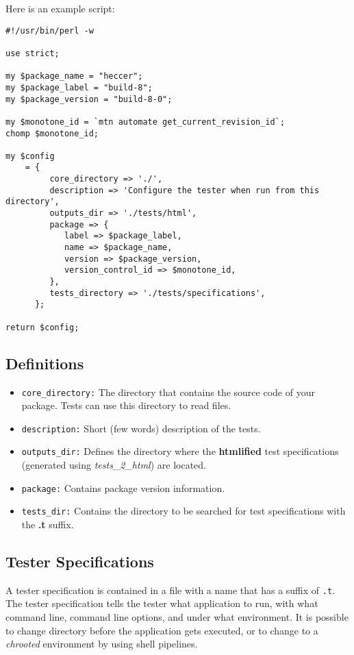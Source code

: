 \documentclass[12pt]{article}
\begin{document}
Here is an example script:
\begin{verbatim}
#!/usr/bin/perl -w

use strict;

my $package_name = "heccer";
my $package_label = "build-8";
my $package_version = "build-8-0";

my $monotone_id = `mtn automate get_current_revision_id`;
chomp $monotone_id;

my $config
    = {
         core_directory => './',
         description => 'Configure the tester when run from this directory',
         outputs_dir => './tests/html',
         package => {
            label => $package_label,
            name => $package_name,
            version => $package_version,
            version_control_id => $monotone_id,
         },
         tests_directory => './tests/specifications',
      };

return $config;
\end{verbatim}

\subsection*{Definitions}

\begin{itemize}
   \item[]{\tt core\_directory:} The directory that contains the source code of your package. Tests can use this directory to read files.
   \item[]{\tt description:} Short (few words) description of the tests.
   \item[]{\tt outputs\_dir:} Defines the directory where the {\bf htmlified} test specifications (generated using {\it tests\_2\_html}) are located.
   \item[]{\tt package:} Contains package version information.
   \item[]{\tt tests\_dir:} Contains the directory to be searched for test specifications with the {\bf .t} suffix. 
\end{itemize}

\subsection*{Tester Specifications}

A tester specification is contained in a file with a name that has a suffix of {\tt .t}. The tester specification tells the tester what application to run, with what command line, command line options, and under what environment. It is possible to change directory before the application gets executed, or to change to a {\it chrooted} environment by using shell pipelines.
\end{document}
